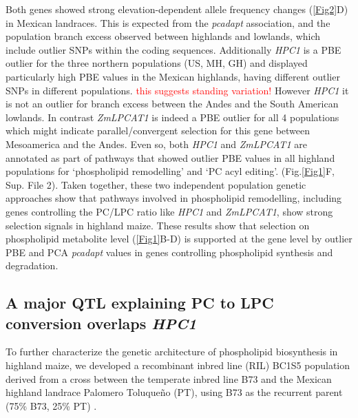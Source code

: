 \documentclass[9pt,twocolumn,twoside,lineno]{biorxiv}
\newcommand{\jri}[1]{{\textcolor{red}{#1}}}
\newcommand{\hpc}{\textit{HPC1}\xspace}
\begin{document}
Both genes showed strong elevation-dependent allele frequency changes (\cref{Fig2}D) in  Mexican landraces.
This is expected from the \textit{pcadapt} association, and the population branch excess observed between highlands and lowlands, which include outlier SNPs within the coding sequences. 
Additionally \hpc is a PBE outlier for the three northern populations (US, MH, GH) and displayed particularly high PBE values in the Mexican highlands, having different outlier SNPs in different populations. \jri{this suggests standing variation!}
However \hpc it is not an outlier for branch excess between the Andes and the South American lowlands.
In contrast \textit{ZmLPCAT1} is indeed a PBE outlier for all 4 populations which might indicate  parallel/convergent selection for this gene between Mesoamerica and the Andes.
Even so, both \hpc and \textit{ZmLPCAT1} are annotated as part of pathways that showed outlier PBE values in all highland populations for ‘phospholipid remodelling’ and ‘PC acyl editing’. (Fig.\cref{Fig1}F, Sup. File 2). 
Taken together, these two independent population genetic approaches show that pathways involved in phospholipid remodelling,  including genes controlling the PC/LPC ratio like \hpc and \textit{ZmLPCAT1}, show strong selection signals in highland maize. 
These results show that selection on phospholipid metabolite level (\cref{Fig1}B-D) is supported at the gene level by outlier PBE and PCA \textit{pcadapt} values in genes controlling phospholipid synthesis and degradation.

\subsection{A major QTL explaining PC to LPC conversion overlaps \hpc}
To further characterize the genetic architecture of phospholipid biosynthesis in highland maize, we developed a recombinant inbred line (RIL) BC1S5 population derived from a cross between the temperate inbred line B73 and the Mexican highland landrace Palomero Toluqueño (PT), using B73 as the recurrent parent (75\% B73, 25\% PT) \cite{Perez-Limon2022-lg}.
\end{document}
